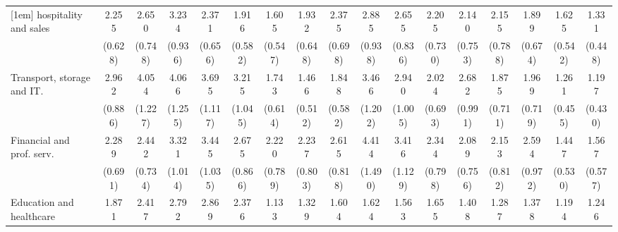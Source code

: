 {\begin{tabular}{l*{16}{c}}
[1em]
hospitality and sales&       2.255\sym{**} &       2.650\sym{***}&       3.234\sym{***}&       2.371\sym{**} &       1.916\sym{*}  &       1.605         &       1.932\sym{*}  &       2.375\sym{**} &       2.885\sym{**} &       2.655\sym{**} &       2.205\sym{*}  &       2.140\sym{*}  &       2.155\sym{*}  &       1.899         &       1.625         &       1.331         \\
                    &     (0.628)         &     (0.748)         &     (0.936)         &     (0.656)         &     (0.582)         &     (0.547)         &     (0.648)         &     (0.698)         &     (0.938)         &     (0.836)         &     (0.730)         &     (0.753)         &     (0.788)         &     (0.674)         &     (0.542)         &     (0.448)         \\
[1em]
Transport, storage and IT.&       2.962\sym{***}&       4.054\sym{***}&       4.066\sym{***}&       3.695\sym{***}&       3.215\sym{***}&       1.743         &       1.466         &       1.848         &       3.466\sym{***}&       2.940\sym{**} &       2.024\sym{*}  &       2.682\sym{**} &       1.875         &       1.969         &       1.261         &       1.197         \\
                    &     (0.886)         &     (1.227)         &     (1.255)         &     (1.117)         &     (1.045)         &     (0.614)         &     (0.512)         &     (0.582)         &     (1.202)         &     (1.005)         &     (0.693)         &     (0.991)         &     (0.711)         &     (0.719)         &     (0.455)         &     (0.430)         \\
[1em]
Financial and prof. serv.&       2.289\sym{**} &       2.442\sym{**} &       3.321\sym{***}&       3.445\sym{***}&       2.675\sym{**} &       2.220\sym{*}  &       2.237\sym{*}  &       2.615\sym{**} &       4.414\sym{***}&       3.416\sym{***}&       2.344\sym{*}  &       2.089\sym{*}  &       2.153\sym{*}  &       2.594\sym{*}  &       1.447         &       1.567         \\
                    &     (0.691)         &     (0.734)         &     (1.014)         &     (1.035)         &     (0.866)         &     (0.789)         &     (0.803)         &     (0.818)         &     (1.490)         &     (1.129)         &     (0.798)         &     (0.756)         &     (0.812)         &     (0.972)         &     (0.530)         &     (0.577)         \\
[1em]
Education and healthcare&       1.871         &       2.417\sym{**} &       2.792\sym{**} &       2.869\sym{**} &       2.376\sym{*}  &       1.133         &       1.329         &       1.604         &       1.624         &       1.563         &       1.655         &       1.408         &       1.287         &       1.378         &       1.194         &       1.246         \\

\end{tabular}}
